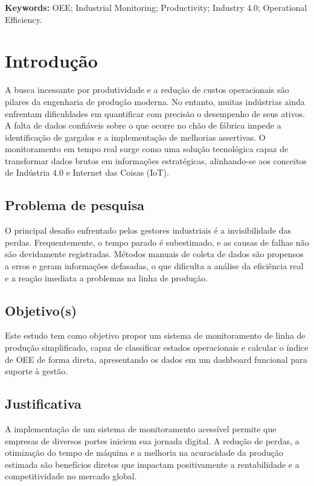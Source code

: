 \documentclass[12pt]{unisenaiclass}
\begin{document}
\begin{justify}
    \textbf{Keywords:} OEE; Industrial Monitoring; Productivity; Industry 4.0; Operational Efficiency.
\end{justify}

\section{Introdução}
A busca incessante por produtividade e a redução de custos operacionais são pilares da engenharia de produção moderna. No entanto, muitas indústrias ainda enfrentam dificuldades em quantificar com precisão o desempenho de seus ativos. A falta de dados confiáveis sobre o que ocorre no chão de fábrica impede a identificação de gargalos e a implementação de melhorias assertivas. O monitoramento em tempo real surge como uma solução tecnológica capaz de transformar dados brutos em informações estratégicas, alinhando-se aos conceitos de Indústria 4.0 e Internet das Coisas (IoT).

\subsection{Problema de pesquisa}
O principal desafio enfrentado pelos gestores industriais é a invisibilidade das perdas. Frequentemente, o tempo parado é subestimado, e as causas de falhas não são devidamente registradas. Métodos manuais de coleta de dados são propensos a erros e geram informações defasadas, o que dificulta a análise da eficiência real e a reação imediata a problemas na linha de produção.

\subsection{Objetivo(s)}
Este estudo tem como objetivo propor um sistema de monitoramento de linha de produção simplificado, capaz de classificar estados operacionais e calcular o índice de OEE de forma direta, apresentando os dados em um dashboard funcional para suporte à gestão.

\subsection{Justificativa}
A implementação de um sistema de monitoramento acessível permite que empresas de diversos portes iniciem sua jornada digital. A redução de perdas, a otimização do tempo de máquina e a melhoria na acuracidade da produção estimada são benefícios diretos que impactam positivamente a rentabilidade e a competitividade no mercado global.
\end{document}
